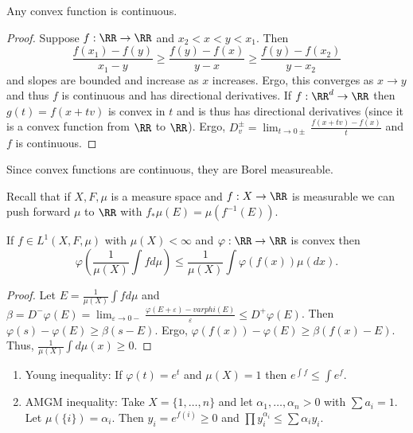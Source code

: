 \documentclass{../uva7310}
\begin{document}
\begin{proposition}
    Any convex function is continuous.
\end{proposition}
\begin{proof}
    Suppose \(f:\RR\rightarrow\RR \) and \(x_2<x<y<x_1\). Then 
    \[
        \frac{f(x_1)-f(y)}{x_1-y}\geq\frac{f(y)-f(x)}{y-x}\geq \frac{f(y)-f(x_2)}{y-x_2}
    \]
    and slopes are bounded and increase as \(x\) increases. Ergo, this converges as \(x\to y\) and thus \(f\) is
    continuous and has directional derivatives. If \(f:\RR^d\rightarrow\RR\) then \(g(t)=f(x+tv)\) is convex in \(t\)
    and is thus has directional derivatives (since it is a convex function from \(\RR \) to \(\RR \)).
    Ergo, \(D_v^\pm = \lim_{t\to 0\pm} \frac{f(x+tv)-f(x)}{t}\) and \(f\) is continuous.
\end{proof}
\begin{corollary}
    Since convex functions are continuous, they are Borel measureable.
\end{corollary}

Recall that if \(X,F,\mu \) is a measure space and \(f:X\rightarrow \RR \) is measurable we can push forward \(\mu \)
to \(\RR \) with \(f_*\mu(E)=\mu(f^{-1}(E)) \).

\begin{thm}
If \(f\in L^1(X,F,\mu)\) with \(\mu(X)<\infty \) and \(\varphi:\RR\rightarrow\RR \) is convex then
    \[
        \varphi\left(\frac{1}{\mu(X)}\int fd\mu\right)\leq \frac{1}{\mu(X)}\int \varphi(f(x))\mu(dx).
    \]
\end{thm}
\begin{proof}
    Let \(E=\frac{1}{\mu(X)}\int fd\mu \) and
    \(\beta=D^-\varphi(E)=\lim_{\varepsilon\to 0-}\frac{\varphi(E+\varepsilon)-varphi(E)}{\varepsilon}\leq D^+\varphi(E)\).
    Then \(\varphi(s)-\varphi(E)\geq \beta(s-E)\). Ergo, \(\varphi(f(x))-\varphi(E)\geq\beta(f(x)-E)\). Thus,
    \(\frac{1}{\mu(X)}\int d\mu(x)\geq 0\).
\end{proof}

\begin{corollary}
    \begin{enumerate}
        \item Young inequality: If \(\varphi(t)=e^t\) and \(\mu(X)=1\) then \(e^{\int f}\leq \int e^f\).
        \item AMGM inequality: Take \(X=\{1,\ldots, n\} \) and let \(\alpha_1,\ldots,\alpha_n>0\) with \(\sum a_i=1\).
        Let \(\mu(\{i\})=\alpha_i\). Then \(y_i=e^{f(i)}\geq 0\) and \(\prod y_i^{\alpha_i} \leq \sum \alpha_i y_i\).
    \end{enumerate}
\end{corollary}
\end{document}
